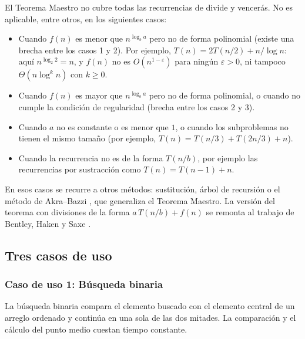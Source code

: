 \documentclass{article}
\begin{document}
        El Teorema Maestro no cubre todas las recurrencias de divide y vencerás. No es
        aplicable, entre otros, en los siguientes casos:
        
        \begin{itemize}
        \item Cuando $f(n)$ es menor que $n^{\log_b a}$ pero no de forma polinomial
                (existe una brecha entre los casos 1 y 2). Por ejemplo,
                $T(n) = 2T(n/2) + n/\log n$: aquí $n^{\log_2 2} = n$, y $f(n)$ no es
                $O(n^{1-\varepsilon})$ para ningún $\varepsilon > 0$, ni tampoco
                $\Theta(n\log^k n)$ con $k \geq 0$.
        \item Cuando $f(n)$ es mayor que $n^{\log_b a}$ pero no de forma polinomial,
                o cuando no cumple la condición de regularidad (brecha entre los
                casos 2 y 3).
        \item Cuando $a$ no es constante o es menor que $1$, o cuando los
                subproblemas no tienen el mismo tamaño (por ejemplo,
                $T(n) = T(n/3) + T(2n/3) + n$).
        \item Cuando la recurrencia no es de la forma $T(n/b)$, por ejemplo las
                recurrencias por sustracción como $T(n) = T(n-1) + n$.
        \end{itemize}
        
        En esos casos se recurre a otros métodos: sustitución, árbol de recursión o
        el método de Akra--Bazzi \citep{akrabazzi1998}, que generaliza el Teorema
        Maestro. La versión del teorema con divisiones de la forma $a\,T(n/b)+f(n)$ se
        remonta al trabajo de Bentley, Haken y Saxe \citep{bentley1980}.
        
        \subsection{Tres casos de uso}
        
        \subsubsection{Caso de uso 1: Búsqueda binaria}
        
        La búsqueda binaria compara el elemento buscado con el elemento central de un
        arreglo ordenado y continúa en una sola de las dos mitades. La comparación y el
        cálculo del punto medio cuestan tiempo constante.
        
\end{document}
